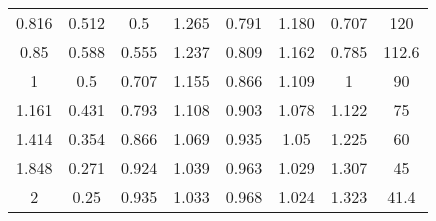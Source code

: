 \documentclass{article}[11pt]
\begin{document}
\begin{table}[H]
\begin{tabular}{cccccccc}
0.816    & 0.512   & 0.5                                        & 1.265                                                                                            & 0.791                                      & 1.180                                                                                            & 0.707                                      & 120                                 \\
0.85     & 0.588   & 0.555                                      & 1.237                                                                                            & 0.809                                      & 1.162                                                                                            & 0.785                                      & 112.6                               \\
1        & 0.5     & 0.707                                      & 1.155                                                                                            & 0.866                                      & 1.109                                                                                            & 1                                          & 90                                  \\
1.161    & 0.431   & 0.793                                      & 1.108                                                                                            & 0.903                                      & 1.078                                                                                            & 1.122                                      & 75                                  \\
1.414    & 0.354   & 0.866                                      & 1.069                                                                                            & 0.935                                      & 1.05                                                                                             & 1.225                                      & 60                                  \\
1.848    & 0.271   & 0.924                                      & 1.039                                                                                            & 0.963                                      & 1.029                                                                                            & 1.307                                      & 45                                  \\
2        & 0.25    & 0.935                                      & 1.033                                                                                            & 0.968                                      & 1.024                                                                                            & 1.323                                      & 41.4                                \\

\end{tabular}
\end{table}
\end{document}
